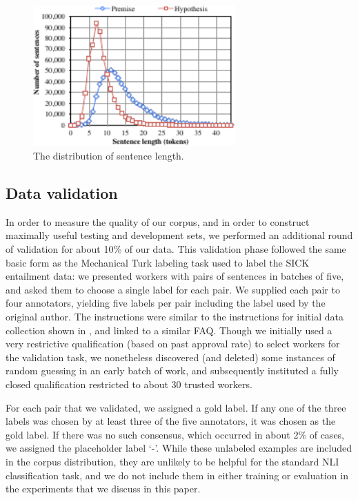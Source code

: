 \begin{figure}
\center
\includegraphics[width=3.05in]{length_dist}
\caption{\label{length-dist}The distribution of sentence length.} 
\end{figure}

\subsection{Data validation}

In order to measure the quality of our corpus, and in order to construct maximally useful testing and development sets, we performed an additional round of validation for about 10\% of our data.
This validation phase followed the same basic form as the Mechanical Turk labeling task used to label the SICK entailment data: we presented workers with pairs of sentences in batches of five, and asked them to choose a single label for each pair. We supplied each pair to four annotators, yielding five labels per pair including the label used by the original author. The instructions were similar to the instructions for initial data collection shown in , and linked to a similar FAQ. Though we initially used a very restrictive qualification (based on past approval rate) to select workers for the validation task, we nonetheless discovered (and deleted) some instances of random guessing in an early batch of work, and subsequently instituted a fully closed qualification restricted to about 30 trusted workers.

For each pair that we validated, we assigned a gold label. If any one of
the three labels was chosen by at least three of the five annotators, it was 
chosen as the gold label. If there was no such consensus, which
occurred in about 2\% of cases, we assigned the placeholder label `-'. 
While these unlabeled examples are included in the corpus distribution, they are
unlikely to be helpful for the standard NLI classification task, and
we do not include them in either training or evaluation in the experiments that we 
discuss in this paper. 

